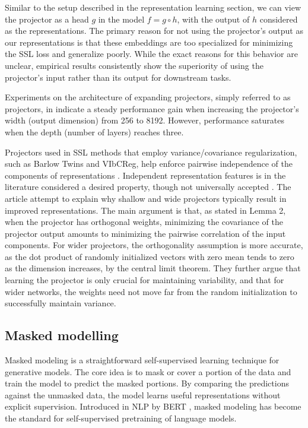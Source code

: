\documentclass[../../thesis.tex]{subfiles}
\begin{document}
Similar to the setup described in the representation learning section, we can view the projector as a head $g$ in the model $f = g\circ h$, with the output of $h$ considered as the representations. The primary reason for not using the projector's output as our representations is that these embeddings are too specialized for minimizing the SSL loss and generalize poorly. While the exact reasons for this behavior are unclear, empirical results consistently show the superiority of using the projector's input rather than its output for downstream tasks.\newline

Experiments on the architecture of expanding projectors, simply referred to as projectors, in \cite{zbontar2021barlow,bardes2022vicreg} indicate a steady performance gain when increasing the projector's width (output dimension) from 256 to 8192. However, performance saturates when the depth (number of layers) reaches three.\newline

Projectors used in SSL methods that employ variance/covariance regularization, such as Barlow Twins and VIbCReg, help enforce pairwise independence of the components of representations \cite{mialon2024variance}. Independent representation features is in the literature considered a desired property, though not universally accepted \cite{träuble2021disentangled,Rep-rev-persp}. The article \cite{mialon2024variance} attempt to explain why shallow and wide projectors typically result in improved representations. The main argument is that, as stated in Lemma 2, when the projector has orthogonal weights, minimizing the covariance of the projector output amounts to minimizing the pairwise correlation of the input components. For wider projectors, the orthogonality assumption is more accurate, as the dot product of randomly initialized vectors with zero mean tends to zero as the dimension increases, by the central limit theorem. They further argue that learning the projector is only crucial for maintaining variability, and that for wider networks, the weights need not move far from the random initialization to successfully maintain variance.   

\subsection{Masked modelling}
\label{section:Masked modelling}
Masked modeling is a straightforward self-supervised learning technique for generative models. The core idea is to mask or cover a portion of the data and train the model to predict the masked portions. By comparing the predictions against the unmasked data, the model learns useful representations without explicit supervision. Introduced in NLP by BERT \cite{devlin2019bert}, masked modeling has become the standard for self-supervised pretraining of language models.\newline
\end{document}
